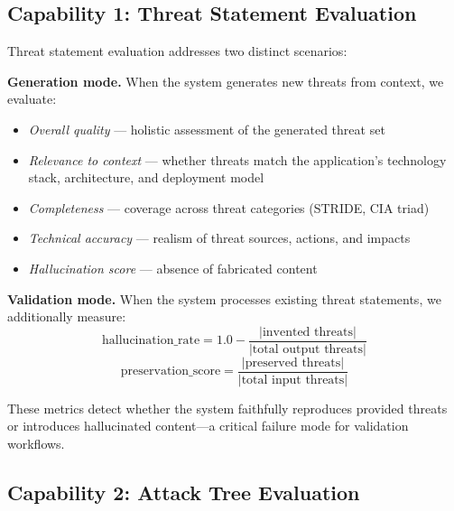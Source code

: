 \subsection{Capability 1: Threat Statement Evaluation}
\label{sec:threat-eval}

Threat statement evaluation addresses two distinct scenarios:

\textbf{Generation mode.} When the system generates new threats from context, we evaluate:
\begin{itemize}
    \item \textit{Overall quality} --- holistic assessment of the generated threat set
    \item \textit{Relevance to context} --- whether threats match the application's technology stack, architecture, and deployment model
    \item \textit{Completeness} --- coverage across threat categories (STRIDE, CIA triad)
    \item \textit{Technical accuracy} --- realism of threat sources, actions, and impacts
    \item \textit{Hallucination score} --- absence of fabricated content
\end{itemize}

\textbf{Validation mode.} When the system processes existing threat statements, we additionally measure:
\begin{equation}
\text{hallucination\_rate} = 1.0 - \frac{|\text{invented threats}|}{|\text{total output threats}|}
\end{equation}
\begin{equation}
\text{preservation\_score} = \frac{|\text{preserved threats}|}{|\text{total input threats}|}
\end{equation}

These metrics detect whether the system faithfully reproduces provided threats or introduces hallucinated content---a critical failure mode for validation workflows.

\subsection{Capability 2: Attack Tree Evaluation}
\label{sec:tree-eval}

